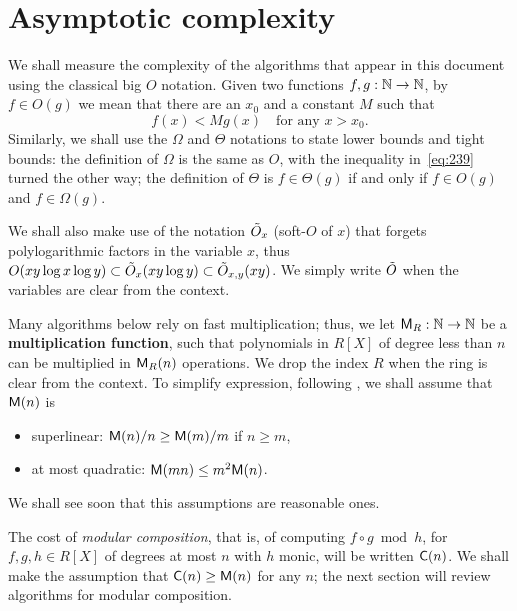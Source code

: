 \section{Asymptotic complexity}
\label{sec:asympt-compl}
We shall measure the complexity of the algorithms that appear in this
document using the classical  big $O$ notation. Given two
functions $f,g:\mathbb{N}\rightarrow\mathbb{N}$, by $f\in O(g)$ we mean that there are an
$x_0$ and a constant $M$ such that
\begin{equation}
  \label{eq:239}
  f(x)<Mg(x) \quad\text{for any $x>x_0$.}  
\end{equation}
Similarly, we shall use the $\Omega$ and $\Theta$ notations to state
lower bounds and tight bounds: the definition of $\Omega$ is the same
as $O$, with the inequality in~\eqref{eq:239} turned the other way;
the definition of $\Theta$ is $f\in\Theta(g)$ if and only if $f\in
O(g)$ and $f\in\Omega(g)$.

We shall also make use of the notation $\tilde{O}_x$
(soft-$O$ of $x$) that forgets polylogarithmic factors
in the variable $x$, thus $O(xy\log x \log y)\subset\tilde{O}_x(xy\log
y)\subset\tilde{O}_{x,y}(xy)$. We simply write $\tilde{O}$ when the
variables are clear from the context.

Many algorithms below rely on fast multiplication; thus, we let
$\mathsf{M}_R : \mathbb{N} \rightarrow \mathbb{N}$ be a
\textbf{multiplication
  function},
such that polynomials in $R[X]$ of degree less than $n$ can be
multiplied in $\mathsf{M}_R(n)$ operations. We drop the index $R$ when the
ring is clear from the context. To simplify expression, following
\cite[$\S$8.3]{vzGG}, we shall assume that $\mathsf{M}(n)$ is
\begin{itemize}
\item superlinear: $\mathsf{M}(n)/n \ge \mathsf{M}(m)/m$ if $n\ge m$,
\item at most quadratic: $\mathsf{M}(mn)\le m^2\mathsf{M}(n)$.
\end{itemize}
We shall see soon that this assumptions are reasonable ones.

The cost of \emph{modular composition},
that is, of computing $f\circ g \bmod h$, for $f,g,h\in R[X]$ of
degrees at most $n$ with $h$ monic, will be written
$\mathsf{C}(n)$. We shall make the assumption that
$\mathsf{C}(n)\ge\mathsf{M}(n)$ for any $n$; the next section will review
algorithms for modular composition.



